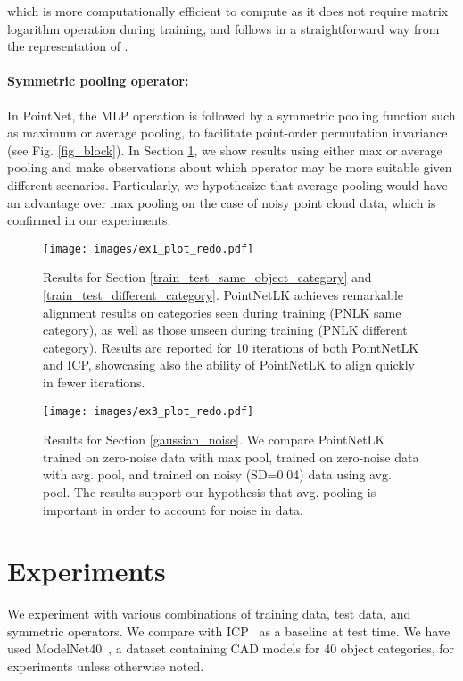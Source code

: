 \documentclass[10pt,twocolumn,letterpaper]{article}
\begin{document}
which is more computationally efficient to compute as it does not require matrix logarithm operation during training, and follows in a straightforward way from the representation of .

\paragraph{Symmetric pooling operator:} 
In PointNet, the MLP operation is followed by a symmetric pooling function such as maximum or average pooling, to facilitate point-order permutation invariance (see Fig. \ref{fig_block}). In Section \ref{experiments}, we show results using either max or average pooling and make observations about which operator may be more suitable given different scenarios. Particularly, we hypothesize that average pooling would have an advantage over max pooling on the case of noisy point cloud data, which is confirmed in our experiments.


\begin{figure}
\centering
\texttt{[image: images/ex1\_plot\_redo.pdf]}
\caption{Results for Section \ref{train_test_same_object_category} and \ref{train_test_different_category}. PointNetLK achieves remarkable alignment results on categories seen during training (PNLK same category), as well as those unseen during training (PNLK different category). Results are reported for 10 iterations of both PointNetLK and ICP, showcasing also the ability of PointNetLK to align quickly in fewer iterations.}
\label{fig_ex1_ex2}
\end{figure}

\begin{figure}
\centering 
\texttt{[image: images/ex3\_plot\_redo.pdf]}
\caption{Results for Section \ref{gaussian_noise}. We compare PointNetLK trained on zero-noise data with max pool, trained on zero-noise data with avg. pool, and trained on noisy (SD=0.04) data using avg. pool. The results support our hypothesis that avg. pooling is important in order to account for noise in data.}
\label{fig_ex3}
\end{figure}

\section{Experiments} \label{experiments}
We experiment with various combinations of training data, test data, and symmetric operators. We compare with ICP~\cite{besl1992method} as a baseline at test time. We have used ModelNet40~\cite{wu20153d}, a dataset containing CAD models for 40 object categories, for experiments unless otherwise noted.
\end{document}
